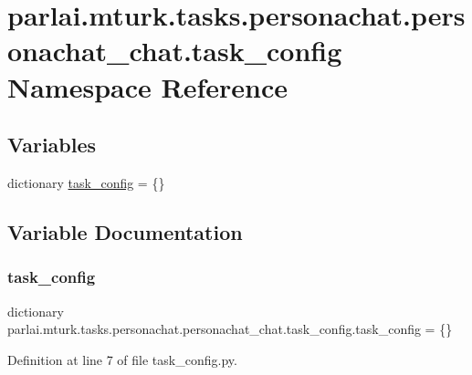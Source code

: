 \hypertarget{namespaceparlai_1_1mturk_1_1tasks_1_1personachat_1_1personachat__chat_1_1task__config}{}\section{parlai.\+mturk.\+tasks.\+personachat.\+personachat\+\_\+chat.\+task\+\_\+config Namespace Reference}
\label{namespaceparlai_1_1mturk_1_1tasks_1_1personachat_1_1personachat__chat_1_1task__config}
\subsection*{Variables}
\begin{DoxyCompactItemize}
\item 
dictionary \hyperlink{namespaceparlai_1_1mturk_1_1tasks_1_1personachat_1_1personachat__chat_1_1task__config_a76cd0d86d2e970853e1ab2c2a7e77d0f}{task\+\_\+config} = \{\}
\end{DoxyCompactItemize}


\subsection{Variable Documentation}
\mbox{\label{namespaceparlai_1_1mturk_1_1tasks_1_1personachat_1_1personachat__chat_1_1task__config_a76cd0d86d2e970853e1ab2c2a7e77d0f}} 
\subsubsection{\texorpdfstring{task\+\_\+config}{task\_config}}
{\footnotesize\ttfamily dictionary parlai.\+mturk.\+tasks.\+personachat.\+personachat\+\_\+chat.\+task\+\_\+config.\+task\+\_\+config = \{\}}



Definition at line 7 of file task\+\_\+config.\+py.

